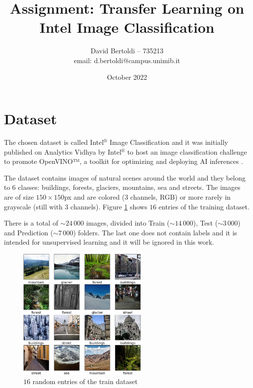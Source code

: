 \documentclass[compsoc]{IEEEtran}
\title{Assignment: Transfer Learning on Intel Image Classification}
\author{David Bertoldi -- 735213 \\ email: d.bertoldi@campus.unimib.it}
\affil{Department of Informatics, Systems and Communication}
\affil{University of Milano-Bicocca}
\date{October 2022}
\begin{document}
\maketitle 



\section{Dataset}\label{sec:insp}
The chosen dataset is called Intel$^\circledR$ Image Classification and it was initially published on Analytics Vidhya by Intel$^\circledR$ to host an image classification challenge to promote OpenVINO™, a toolkit for optimizing and deploying AI inferences \cite{site1}\cite{site2}. \par

The dataset contains images of natural scenes around the world and they belong to $6$ classes: buildings, forests, glaciers, mountains, sea and streets. The images are of size $150\times150$px and are colored ($3$ channels, RGB) or more rarely in grayscale (still with $3$ channels). Figure \ref{fig:samples} shows $16$ entries of the training dataset. \par
There is a total of ${\sim 24\,000}$ images, divided into Train (${\sim14\,000}$), Test (${\sim3\,000}$) and Prediction (${\sim7\,000}$) folders. The last one does not contain labels and it is intended for unsupervised learning and it will be ignored in this work.



\begin{figure}[ht!]
\centering                                                                        
\includegraphics[width=2.5in]{../images/samples.png}
\captionsetup{justification=centering}                                                                                         
\caption{$16$ random entries of the train dataset}
\label{fig:samples}                                                                                                                               
\end{figure}
\end{document}
